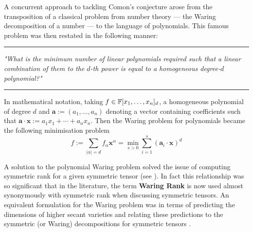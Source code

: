 \documentclass[../Lael_John_MasterThesis_Draft.tex]{subfiles}
\begin{document}

A concurrent approach to tackling Comon's conjecture arose from the transposition of a classical problem from number theory --- the Waring decomposition of a number --- to the language of polynomials. This famous problem was then restated in the following manner:
\vspace{12pt}
\hrule
\vspace{12pt}
\textit{"What is the minimum number of linear polynomials required such that a linear combination of them to the $d$-th power is equal to a homogeneous degree-$d$ polynomial?"}
\vspace{6pt}
\hrule
\vspace{12pt}
In mathematical notation, taking $f \in \mathbb{F}[x_1, \ldots, x_n]_d$, a homogeneous polynomial of degree $d$ and $\mathbf{a}:= (a_1, \ldots, a_n)$ denoting a vector containing coefficients such that $\mathbf{a}\cdot\mathbf{x} := a_1x_1 + \cdots + a_nx_n$. Then the Waring problem for polynomials became the following minimisation problem \begin{equation}
	f:= \sum_{|\alpha| = d} f_{\alpha}\mathbf{x}^{\alpha} = \min_{s > 0} \sum_{i=1}^s(\mathbf{a}_i\cdot \mathbf{x})^d
\end{equation} 

A solution to the polynomial Waring problem solved the issue of computing symmetric rank for a given symmetric tensor (see ). In fact this relationship was so significant that in the literature, the term \textbf{Waring Rank} is now used almost synonymously with symmetric rank when discussing symmetric tensors. An equivalent formulation for the Waring problem was in terms of predicting the dimensions of higher secant varieties and relating these predictions to the symmetric (or Waring) decompositions for symmetric tensors \cite{bernardi_hitchhiker_2018}. 
\end{document}

